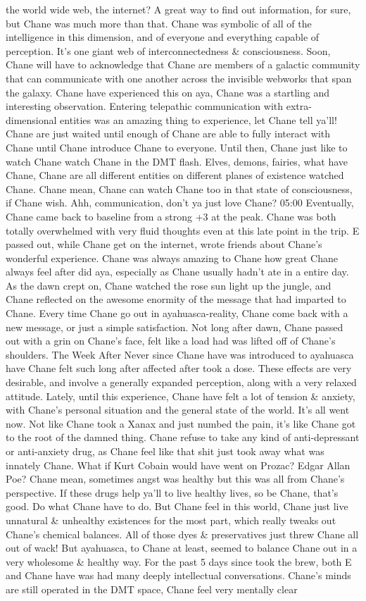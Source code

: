 \documentclass[12pt]{book}
\begin{document}
the world wide web, the internet? A great way to find out information, for sure, but Chane was much more than that. Chane was symbolic of all of the intelligence in this dimension, and of everyone and everything capable of perception. It's one giant web of interconnectedness \& consciousness. Soon, Chane will have to acknowledge that Chane are members of a galactic community that can communicate with one another across the invisible webworks that span the galaxy. Chane have experienced this on aya, Chane was a startling and interesting observation. Entering telepathic communication with extra-dimensional entities was an amazing thing to experience, let Chane tell ya'll! Chane are just waited until enough of Chane are able to fully interact with Chane until Chane introduce Chane to everyone. Until then, Chane just like to watch Chane watch Chane in the DMT flash. Elves, demons, fairies, what have Chane, Chane are all different entities on different planes of existence watched Chane. Chane mean, Chane can watch Chane too in that state of consciousness, if Chane wish. Ahh, communication, don't ya just love Chane? 05:00 Eventually, Chane came back to baseline from a strong +3 at the peak. Chane was both totally overwhelmed with very fluid thoughts even at this late point in the trip. E passed out, while Chane get on the internet, wrote friends about Chane's wonderful experience. Chane was always amazing to Chane how great Chane always feel after did aya, especially as Chane usually hadn't ate in a entire day. As the dawn crept on, Chane watched the rose sun light up the jungle, and Chane reflected on the awesome enormity of the message that had imparted to Chane. Every time Chane go out in ayahuasca-reality, Chane come back with a new message, or just a simple satisfaction. Not long after dawn, Chane passed out with a grin on Chane's face, felt like a load had was lifted off of Chane's shoulders. The Week After Never since Chane have was introduced to ayahuasca have Chane felt such long after affected after took a dose. These effects are very desirable, and involve a generally expanded perception, along with a very relaxed attitude. Lately, until this experience, Chane have felt a lot of tension \& anxiety, with Chane's personal situation and the general state of the world. It's all went now. Not like Chane took a Xanax and just numbed the pain, it's like Chane got to the root of the damned thing. Chane refuse to take any kind of anti-depressant or anti-anxiety drug, as Chane feel like that shit just took away what was innately Chane. What if Kurt Cobain would have went on Prozac? Edgar Allan Poe? Chane mean, sometimes angst was healthy but this was all from Chane's perspective. If these drugs help ya'll to live healthy lives, so be Chane, that's good. Do what Chane have to do. But Chane feel in this world, Chane just live unnatural \& unhealthy existences for the most part, which really tweaks out Chane's chemical balances. All of those dyes \& preservatives just threw Chane all out of wack! But ayahuasca, to Chane at least, seemed to balance Chane out in a very wholesome \& healthy way. For the past 5 days since took the brew, both E and Chane have was had many deeply intellectual conversations. Chane's minds are still operated in the DMT space, Chane feel very mentally clear 
\end{document}
